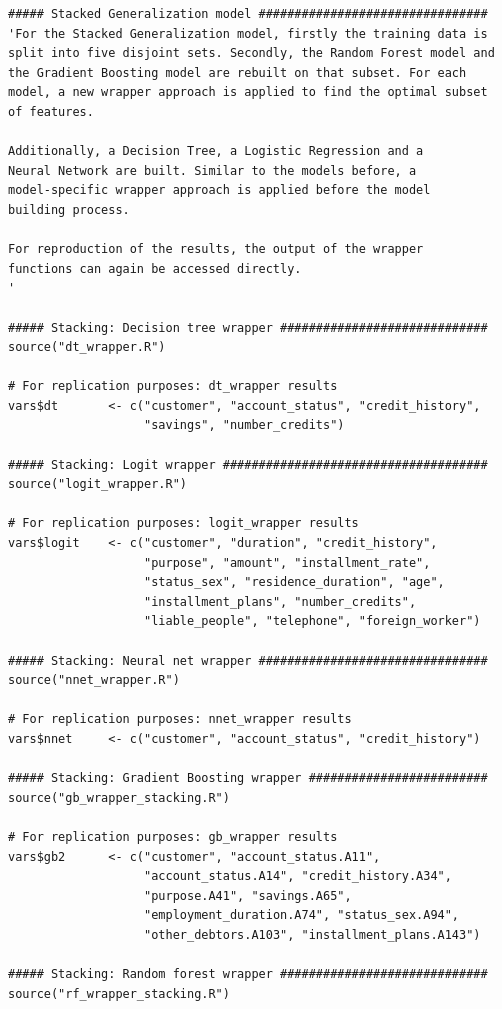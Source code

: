 \documentclass[12pt]{article}
\begin{document}
\begin{lstlisting}
##### Stacked Generalization model ################################
'For the Stacked Generalization model, firstly the training data is
split into five disjoint sets. Secondly, the Random Forest model and 
the Gradient Boosting model are rebuilt on that subset. For each 
model, a new wrapper approach is applied to find the optimal subset
of features.

Additionally, a Decision Tree, a Logistic Regression and a 
Neural Network are built. Similar to the models before, a 
model-specific wrapper approach is applied before the model
building process.

For reproduction of the results, the output of the wrapper 
functions can again be accessed directly.
'

##### Stacking: Decision tree wrapper #############################
source("dt_wrapper.R")

# For replication purposes: dt_wrapper results
vars$dt       <- c("customer", "account_status", "credit_history",
                   "savings", "number_credits")

##### Stacking: Logit wrapper #####################################
source("logit_wrapper.R")

# For replication purposes: logit_wrapper results
vars$logit    <- c("customer", "duration", "credit_history",
                   "purpose", "amount", "installment_rate",
                   "status_sex", "residence_duration", "age",
                   "installment_plans", "number_credits",
                   "liable_people", "telephone", "foreign_worker")  

##### Stacking: Neural net wrapper ################################
source("nnet_wrapper.R")

# For replication purposes: nnet_wrapper results
vars$nnet     <- c("customer", "account_status", "credit_history")

##### Stacking: Gradient Boosting wrapper #########################
source("gb_wrapper_stacking.R") 

# For replication purposes: gb_wrapper results
vars$gb2      <- c("customer", "account_status.A11", 
                   "account_status.A14", "credit_history.A34",
                   "purpose.A41", "savings.A65", 
                   "employment_duration.A74", "status_sex.A94",
                   "other_debtors.A103", "installment_plans.A143")      

##### Stacking: Random forest wrapper #############################
source("rf_wrapper_stacking.R")


\end{lstlisting}
\end{document}
